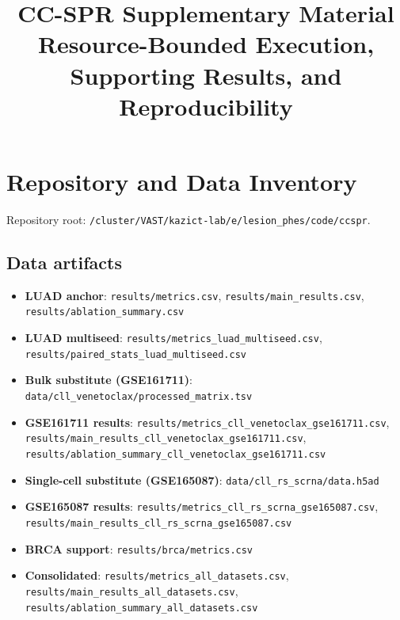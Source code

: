 \documentclass[11pt]{article}
\title{CC-SPR Supplementary Material\\[6pt]
\large Resource-Bounded Execution, Supporting Results, and Reproducibility}
\author{}
\date{}
\begin{document}
\maketitle

\tableofcontents
\newpage

\section{Repository and Data Inventory}

Repository root: \texttt{/cluster/VAST/kazict-lab/e/lesion\_phes/code/ccspr}.

\subsection{Data artifacts}
\begin{itemize}[leftmargin=1.5em]
\item \textbf{LUAD anchor}: \texttt{results/metrics.csv}, \texttt{results/main\_results.csv}, \texttt{results/ablation\_summary.csv}
\item \textbf{LUAD multiseed}: \texttt{results/metrics\_luad\_multiseed.csv}, \texttt{results/paired\_stats\_luad\_multiseed.csv}
\item \textbf{Bulk substitute (GSE161711)}: \texttt{data/cll\_venetoclax/processed\_matrix.tsv}
\item \textbf{GSE161711 results}: \texttt{results/metrics\_cll\_venetoclax\_gse161711.csv}, \texttt{results/main\_results\_cll\_venetoclax\_gse161711.csv}, \texttt{results/ablation\_summary\_cll\_venetoclax\_gse161711.csv}
\item \textbf{Single-cell substitute (GSE165087)}: \texttt{data/cll\_rs\_scrna/data.h5ad}
\item \textbf{GSE165087 results}: \texttt{results/metrics\_cll\_rs\_scrna\_gse165087.csv}, \texttt{results/main\_results\_cll\_rs\_scrna\_gse165087.csv}
\item \textbf{BRCA support}: \texttt{results/brca/metrics.csv}
\item \textbf{Consolidated}: \texttt{results/metrics\_all\_datasets.csv}, \texttt{results/main\_results\_all\_datasets.csv}, \texttt{results/ablation\_summary\_all\_datasets.csv}
\end{itemize}
\end{document}
